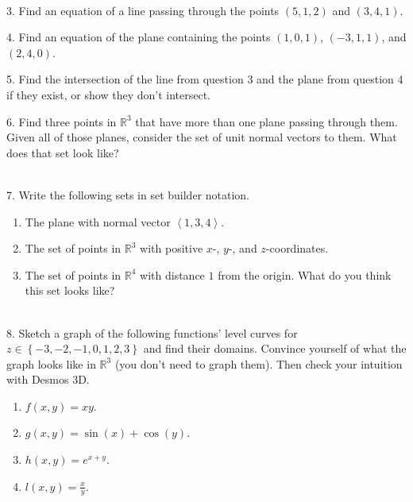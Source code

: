 \documentclass{article}
\begin{document}
~\\

3. Find an equation of a line passing through the points $(5, 1, 2)$ and $(3, 4, 1)$.

4. Find an equation of the plane containing the points $(1, 0, 1)$, $(-3, 1, 1)$, and $(2, 4, 0)$.

5. Find the intersection of the line from question 3 and the plane from question 4 if they exist, or show they don't intersect.

6. Find three points in $\mathbb{R}^3$ that have more than one plane passing through them. Given all of those planes, consider the set of unit normal vectors to them. What does that set look like?

~\\

7. Write the following sets in set builder notation.

\begin{enumerate}

	\item The plane with normal vector $\left< 1, 3, 4 \right>$.

	\item The set of points in $\mathbb{R}^3$ with positive $x$-, $y$-, and $z$-coordinates.

	\item The set of points in $\mathbb{R}^4$ with distance $1$ from the origin. What do you think this set looks like?

\end{enumerate}

~\\

8. Sketch a graph of the following functions' level curves for $z \in \left\{ -3, -2, -1, 0, 1, 2, 3 \right\}$ and find their domains. Convince yourself of what the graph looks like in $\mathbb{R}^3$ (you don't need to graph them). Then check your intuition with Desmos 3D.

\begin{enumerate}

	\item $f(x, y) = xy$.

	\item $g(x, y) = \sin(x) + \cos(y)$.

	\item $h(x, y) = e^{x + y}$.

	\item $l(x, y) = \frac{x}{y}$.

\end{enumerate}
\end{document}
